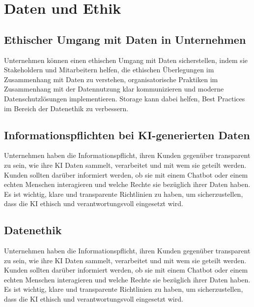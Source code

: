 \section{Daten und Ethik}
\subsection{Ethischer Umgang mit Daten in Unternehmen}

Unternehmen können einen ethischen Umgang mit Daten sicherstellen, indem sie Stakeholdern und Mitarbeitern helfen, die ethischen Überlegungen im Zusammenhang mit Daten zu verstehen, organisatorische Praktiken im Zusammenhang mit der Datennutzung klar kommunizieren und moderne Datenschutzlösungen implementieren. Storage kann dabei helfen, Best Practices im Bereich der Datenethik zu verbessern.
\citep{ai-ethik-pure}

\subsection{Informationspflichten bei KI-generierten Daten}

Unternehmen haben die Informationspflicht, ihren Kunden gegenüber transparent zu sein, wie ihre KI Daten sammelt, verarbeitet und mit wem sie geteilt werden. Kunden sollten darüber informiert werden, ob sie mit einem Chatbot oder einem echten Menschen interagieren und welche Rechte sie bezüglich ihrer Daten haben. Es ist wichtig, klare und transparente Richtlinien zu haben, um sicherzustellen, dass die KI ethisch und verantwortungsvoll eingesetzt wird.
\citep{ai-res-cmm360}

\subsection{Datenethik}

Unternehmen haben die Informationspflicht, ihren Kunden gegenüber transparent zu sein, wie ihre KI Daten sammelt, verarbeitet und mit wem sie geteilt werden. Kunden sollten darüber informiert werden, ob sie mit einem Chatbot oder einem echten Menschen interagieren und welche Rechte sie bezüglich ihrer Daten haben. Es ist wichtig, klare und transparente Richtlinien zu haben, um sicherzustellen, dass die KI ethisch und verantwortungsvoll eingesetzt wird.
\citep{ai-ethik-pure}